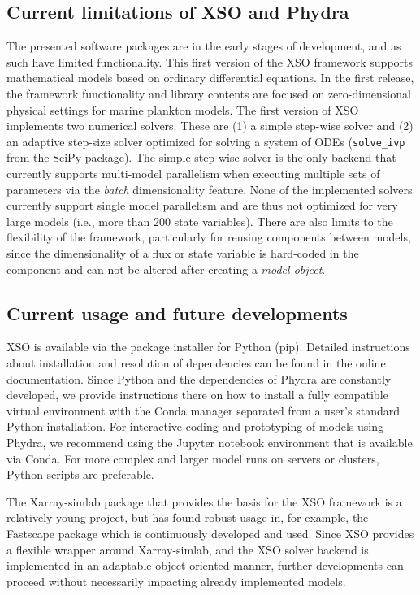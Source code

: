 \documentclass[gmd, manuscript]{copernicus}
\begin{document}
\subsection{Current limitations of XSO and Phydra}

The presented software packages are in the early stages of development, and as such have limited functionality. This first version of the XSO framework supports mathematical models based on ordinary differential equations. In the first release, the framework functionality and library contents are focused on zero-dimensional physical settings for marine plankton models. The first version of XSO implements two numerical solvers. These are (1) a simple step-wise solver and (2) an adaptive step-size solver optimized for solving a system of ODEs (\texttt{solve\_ivp} from the SciPy package). 
The simple step-wise solver is the only backend that currently supports multi-model parallelism when executing multiple sets of parameters via the \textit{batch} dimensionality feature. None of the implemented solvers currently support single model parallelism and are thus not optimized for very large models (i.e., more than 200 state variables). There are also limits to the flexibility of the framework, particularly for reusing components between models, since the dimensionality of a flux or state variable is hard-coded in the component and can not be altered after creating a \textit{model object}.


\subsection{Current usage and future developments}

XSO is available via the package installer for Python (pip). Detailed instructions about installation and resolution of dependencies can be found in the online documentation. Since Python and the dependencies of Phydra are constantly developed, we provide instructions there on how to install a fully compatible virtual environment with the Conda manager separated from a user's standard Python installation. For interactive coding and prototyping of models using Phydra, we recommend using the Jupyter notebook environment that is available via Conda. For more complex and larger model runs on servers or clusters, Python scripts are preferable.

The Xarray-simlab package that provides the basis for the XSO framework is a relatively young project, but has found robust usage in, for example, the Fastscape package \citep{Bovy2021Fastscape-lem/fastscape:V0.1.0beta3} which is continuously developed and used. Since XSO provides a flexible wrapper around Xarray-simlab, and the XSO solver backend is implemented in an adaptable object-oriented manner, further developments can proceed without necessarily impacting already implemented models.
\end{document}
